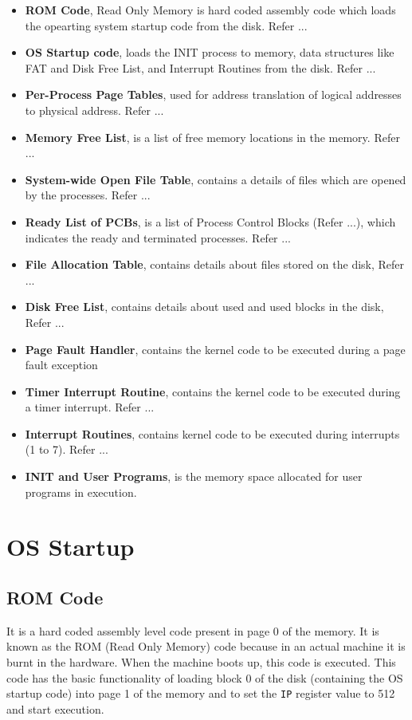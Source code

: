 \documentclass[10pt]{report}
\begin{document}
\begin{itemize}
	\item \textbf{ROM Code}, Read Only Memory is hard coded assembly code which loads the opearting system startup code from the disk. Refer  ... 
	\item \textbf{OS Startup code}, loads the INIT process to memory, data structures like FAT and Disk Free List, and Interrupt Routines from the disk. Refer ...
	\item \textbf{Per-Process Page Tables}, used for address translation of logical addresses to physical address. Refer ...
	\item \textbf{Memory Free List}, is a list of free memory locations in the memory. Refer ...
	\item \textbf{System-wide Open File Table}, contains a details of files which are opened by the processes. Refer ...
	\item \textbf{Ready List of PCBs}, is a list of Process Control Blocks (Refer ...), which indicates the ready and terminated processes. Refer ...
	\item \textbf{File Allocation Table}, contains details about files stored on the disk, Refer ...
	\item \textbf{Disk Free List}, contains details about used and used blocks in the disk, Refer ...
	\item \textbf{Page Fault Handler}, contains the kernel code to be executed during a page fault exception
	\item \textbf{Timer Interrupt Routine}, contains the kernel code to be executed during a timer interrupt. Refer ... 
	
	\item \textbf{Interrupt Routines}, contains kernel code to be executed during interrupts (1 to 7). Refer ...
	\item \textbf{INIT and User Programs}, is the memory space allocated for user programs in execution.
\end{itemize}

\chapter{OS Startup}
\label{chp:osstartup}



\section{ROM Code}
\label{lbl:romcode}
It is a hard coded assembly level code present in page 0 of the memory. It is known as the ROM (Read Only Memory) code because in an actual machine it is burnt in the hardware. When the machine boots up, this code is executed. This code has the basic functionality of loading block 0 of the disk (containing the OS startup code) into page 1 of the memory and to set the \texttt{IP} register value to 512 and start execution.
\end{document}
